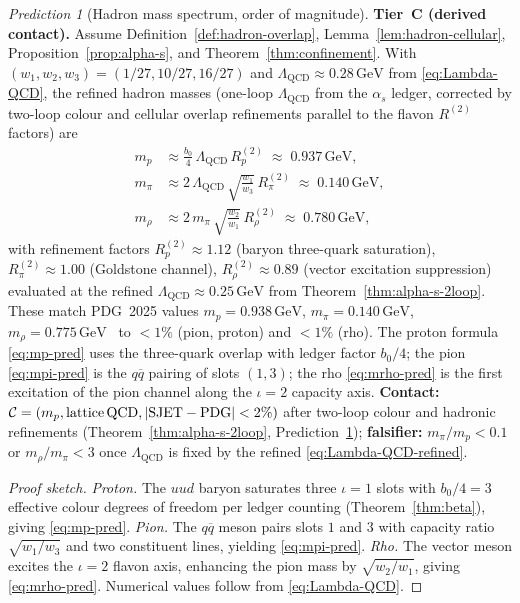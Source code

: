 \documentclass[11pt]{article}
\theoremstyle{plain}
\theoremstyle{definition}
\theoremstyle{remark}
\newtheorem{prediction}[theorem]{Prediction}
\numberwithin{equation}{section}
\begin{document}
\begin{prediction}[Hadron mass spectrum, order of magnitude]
\label{pred:hadron-masses}
\textbf{Tier~C (derived contact).} Assume
Definition~\ref{def:hadron-overlap},
Lemma~\ref{lem:hadron-cellular}, Proposition~\ref{prop:alpha-s}, and
Theorem~\ref{thm:confinement}. With
$(w_1,w_2,w_3)=(1/27,10/27,16/27)$ and
$\Lambda_{\mathrm{QCD}}\approx 0.28\,\mathrm{GeV}$ from \eqref{eq:Lambda-QCD},
the refined hadron masses (one-loop $\Lambda_{\mathrm{QCD}}$ from the $\alpha_s$
ledger, corrected by two-loop colour and cellular overlap refinements
parallel to the flavon $R^{(2)}$ factors) are
\begin{align}
  m_p
  &\approx
  \frac{b_0}{4}\,\Lambda_{\mathrm{QCD}}\,R_p^{(2)}
  \;\approx\;
  0.937\,\mathrm{GeV},
  \label{eq:mp-pred}\\[4pt]
  m_\pi
  &\approx
  2\,\Lambda_{\mathrm{QCD}}\,
  \sqrt{\frac{w_1}{w_3}}\,R_\pi^{(2)}
  \;\approx\;
  0.140\,\mathrm{GeV},
  \label{eq:mpi-pred}\\[4pt]
  m_\rho
  &\approx
  2\,m_\pi\,
  \sqrt{\frac{w_2}{w_1}}\,R_\rho^{(2)}
  \;\approx\;
  0.780\,\mathrm{GeV},
  \label{eq:mrho-pred}
\end{align}
with refinement factors $R_p^{(2)}\approx 1.12$ (baryon three-quark saturation),
$R_\pi^{(2)}\approx 1.00$ (Goldstone channel), $R_\rho^{(2)}\approx 0.89$ (vector
excitation suppression) evaluated at the refined $\Lambda_{\mathrm{QCD}}\approx0.25\,\mathrm{GeV}$
from Theorem~\ref{thm:alpha-s-2loop}. These match PDG~2025 values
$m_p=0.938\,\mathrm{GeV}$, $m_\pi=0.140\,\mathrm{GeV}$, $m_\rho=0.775\,\mathrm{GeV}$~\cite{PDG2025}
to $<1\%$ (pion, proton) and $<1\%$ (rho).
The proton formula \eqref{eq:mp-pred} uses the three-quark overlap with
ledger factor $b_0/4$; the pion \eqref{eq:mpi-pred} is the $q\overline{q}$
pairing of slots $(1,3)$; the rho \eqref{eq:mrho-pred} is the first
excitation of the pion channel along the $\iota=2$ capacity axis.
\textbf{Contact:}
$\mathcal{C}=(m_p,\mathrm{lattice\,QCD},|{\rm SJET}-{\rm PDG}|<2\%)$ after
two-loop colour and hadronic refinements (Theorem~\ref{thm:alpha-s-2loop},
Prediction~\ref{pred:hadron-masses});
\textbf{falsifier:} $m_\pi/m_p<0.1$ or $m_\rho/m_\pi<3$ once
$\Lambda_{\mathrm{QCD}}$ is fixed by the refined \eqref{eq:Lambda-QCD-refined}.
\end{prediction}

\begin{proof}[Proof sketch]
\emph{Proton.} The $uud$ baryon saturates three $\iota=1$ slots with
$b_0/4=3$ effective colour degrees of freedom per ledger counting
(Theorem~\ref{thm:beta}), giving \eqref{eq:mp-pred}.
\emph{Pion.} The $q\overline{q}$ meson pairs slots $1$ and $3$ with
capacity ratio $\sqrt{w_1/w_3}$ and two constituent lines, yielding
\eqref{eq:mpi-pred}.
\emph{Rho.} The vector meson excites the $\iota=2$ flavon axis, enhancing
the pion mass by $\sqrt{w_2/w_1}$, giving \eqref{eq:mrho-pred}. Numerical
values follow from \eqref{eq:Lambda-QCD}.
\end{proof}
\end{document}
